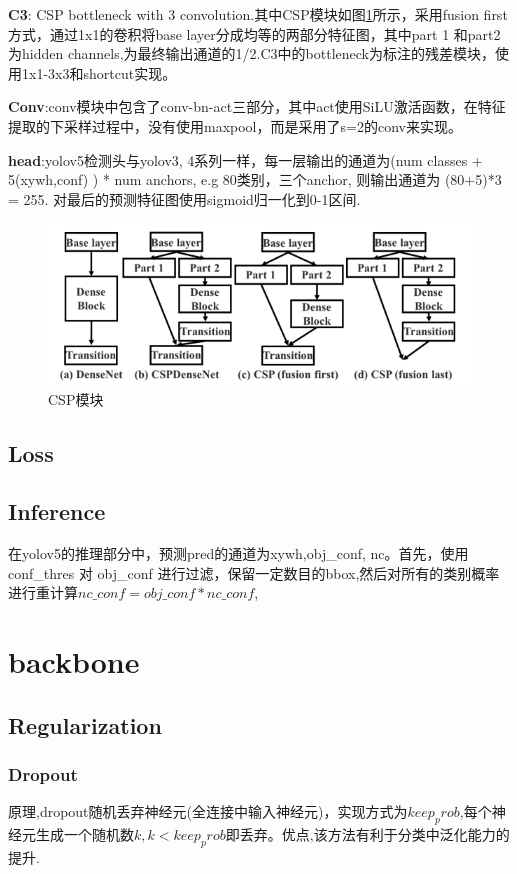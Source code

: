 \documentclass{article}
\begin{document}
\textbf{C3}: CSP bottleneck with 3 convolution\cite{wang2020cspnet}.其中CSP模块如图\ref{Fig.csp}所示，采用fusion first方式，通过1x1的卷积将base layer分成均等的两部分特征图，其中part 1 和part2为hidden channels,为最终输出通道的1/2.C3中的bottleneck为标注的残差模块，使用1x1-3x3和shortcut实现。

\textbf{Conv}:conv模块中包含了conv-bn-act三部分，其中act使用SiLU激活函数，在特征提取的下采样过程中，没有使用maxpool，而是采用了s=2的conv来实现。

\textbf{head}:yolov5检测头与yolov3, 4系列一样，每一层输出的通道为(num classes + 5(xywh,conf) ) * num anchors, e.g 80类别，三个anchor, 则输出通道为 (80+5)*3 = 255. 对最后的预测特征图使用sigmoid归一化到0-1区间.

\begin{figure}[htp!]
\centering
\includegraphics[scale=0.6]{images/csp_block.png}
\caption{CSP模块}
\label{Fig.csp}
\end{figure}

\subsection{Loss}


\subsection{Inference}
在yolov5的推理部分中，预测pred的通道为xywh,obj\_conf, nc。首先，使用conf\_thres 对 obj\_conf 进行过滤，保留一定数目的bbox,然后对所有的类别概率进行重计算$nc\_conf = obj\_conf * nc\_conf$,

\section{backbone}
\subsection{Regularization}
\subsubsection{Dropout}
原理,dropout随机丢弃神经元(全连接中输入神经元)，实现方式为$keep_prob$,每个神经元生成一个随机数$k,k<keep_prob$即丢弃。优点,该方法有利于分类中泛化能力的提升.
\end{document}
